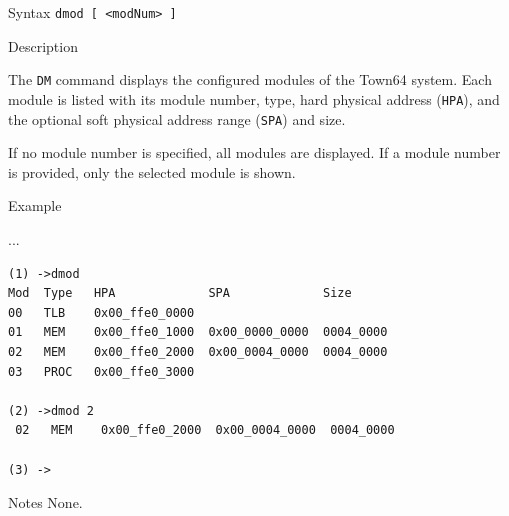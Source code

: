 %
%
\pagebreak
{}

\begin{iPageDescEntry}{Syntax}
\texttt{dmod [ <modNum> ]}
\end{iPageDescEntry}

\begin{iPageDescEntry}{Description}

The \texttt{DM} command displays the configured modules of the Town64 system.
Each module is listed with its module number, type, hard physical address
(\texttt{HPA}), and the optional soft physical address range
(\texttt{SPA}) and size.

If no module number is specified, all modules are displayed. If a module
number is provided, only the selected module is shown.

\end{iPageDescEntry}

\begin{iPageDescEntry}{Example}

... 
\begin{lstlisting}[style=iPageOpStyle]
(1) ->dmod
Mod  Type   HPA             SPA             Size    
00   TLB    0x00_ffe0_0000  
01   MEM    0x00_ffe0_1000  0x00_0000_0000  0004_0000  
02   MEM    0x00_ffe0_2000  0x00_0004_0000  0004_0000  
03   PROC   0x00_ffe0_3000  

(2) ->dmod 2
 02   MEM    0x00_ffe0_2000  0x00_0004_0000  0004_0000

(3) ->
\end{lstlisting}
\end{iPageDescEntry}

\begin{iPageDescEntry}{Notes}
None.
\end{iPageDescEntry}
